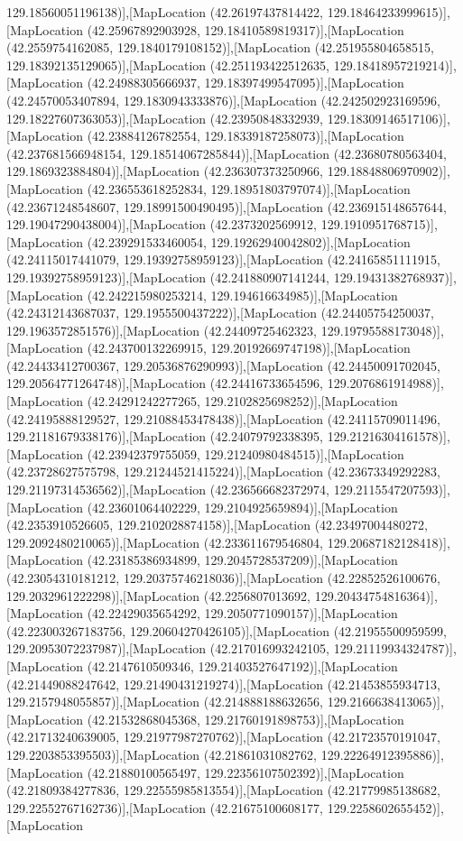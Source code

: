 129.18560051196138)],[MapLocation (42.26197437814422, 129.18464233999615)],[MapLocation (42.25967892903928, 129.18410589819317)],[MapLocation (42.2559754162085, 129.1840179108152)],[MapLocation (42.251955804658515, 129.18392135129065)],[MapLocation (42.251193422512635, 129.18418957219214)],[MapLocation (42.24988305666937, 129.18397499547095)],[MapLocation (42.24570053407894, 129.1830943333876)],[MapLocation (42.242502923169596, 129.18227607363053)],[MapLocation (42.23950848332939, 129.18309146517106)],[MapLocation (42.23884126782554, 129.18339187258073)],[MapLocation (42.237681566948154, 129.18514067285844)],[MapLocation (42.23680780563404, 129.1869323884804)],[MapLocation (42.236307373250966, 129.18848806970902)],[MapLocation (42.236553618252834, 129.18951803797074)],[MapLocation (42.23671248548607, 129.18991500490495)],[MapLocation (42.236915148657644, 129.19047290438004)],[MapLocation (42.2373202569912, 129.1910951768715)],[MapLocation (42.239291533460054, 129.19262940042802)],[MapLocation (42.24115017441079, 129.19392758959123)],[MapLocation (42.24165851111915, 129.19392758959123)],[MapLocation (42.241880907141244, 129.19431382768937)],[MapLocation (42.242215980253214, 129.194616634985)],[MapLocation (42.24312143687037, 129.1955500437222)],[MapLocation (42.24405754250037, 129.1963572851576)],[MapLocation (42.24409725462323, 129.19795588173048)],[MapLocation (42.243700132269915, 129.20192669747198)],[MapLocation (42.24433412700367, 129.20536876290993)],[MapLocation (42.24450091702045, 129.20564771264748)],[MapLocation (42.24416733654596, 129.2076861914988)],[MapLocation (42.24291242277265, 129.2102825698252)],[MapLocation (42.24195888129527, 129.21088453478438)],[MapLocation (42.24115709011496, 129.21181679338176)],[MapLocation (42.24079792338395, 129.21216304161578)],[MapLocation (42.23942379755059, 129.21240980484515)],[MapLocation (42.23728627575798, 129.21244521415224)],[MapLocation (42.23673349292283, 129.21197314536562)],[MapLocation (42.236566682372974, 129.2115547207593)],[MapLocation (42.23601064402229, 129.2104925659894)],[MapLocation (42.2353910526605, 129.2102028874158)],[MapLocation (42.23497004480272, 129.2092480210065)],[MapLocation (42.233611679546804, 129.20687182128418)],[MapLocation (42.23185386934899, 129.2045728537209)],[MapLocation (42.23054310181212, 129.20375746218036)],[MapLocation (42.22852526100676, 129.2032961222298)],[MapLocation (42.2256807013692, 129.20434754816364)],[MapLocation (42.22429035654292, 129.2050771090157)],[MapLocation (42.223003267183756, 129.20604270426105)],[MapLocation (42.21955500959599, 129.20953072237987)],[MapLocation (42.217016993242105, 129.21119934324787)],[MapLocation (42.2147610509346, 129.21403527647192)],[MapLocation (42.21449088247642, 129.21490431219274)],[MapLocation (42.21453855934713, 129.2157948055857)],[MapLocation (42.214888188632656, 129.2166638413065)],[MapLocation (42.21532868045368, 129.21760191898753)],[MapLocation (42.21713240639005, 129.21977987270762)],[MapLocation (42.21723570191047, 129.2203853395503)],[MapLocation (42.21861031082762, 129.22264912395886)],[MapLocation (42.21880100565497, 129.22356107502392)],[MapLocation (42.21809384277836, 129.22555985813554)],[MapLocation (42.21779985138682, 129.22552767162736)],[MapLocation (42.21675100608177, 129.2258602655452)],[MapLocation 